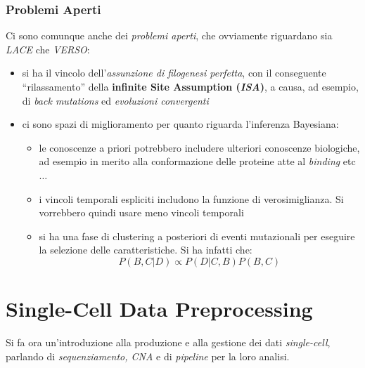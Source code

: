\documentclass[a4paper,12pt, oneside]{book}
\begin{document}
\subsection{Problemi Aperti}
Ci sono comunque anche dei \textit{problemi aperti}, che ovviamente riguardano
sia \textit{LACE} che \textit{VERSO}:
\begin{itemize}
  \item si ha il vincolo dell'\textit{assunzione di filogenesi perfetta}, con il
  conseguente ``rilassamento'' della \textbf{infinite Site Assumption
    (\textit{ISA})}, a causa, ad esempio, di \textit{back mutations} ed
  \textit{evoluzioni convergenti}
  \item ci sono spazi di miglioramento per quanto riguarda l'inferenza
  Bayesiana:
  \begin{itemize}
    \item le conoscenze a priori potrebbero includere ulteriori conoscenze
    biologiche, ad esempio in merito alla conformazione delle proteine atte
    al \textit{binding} etc$\ldots$
    \item i vincoli temporali espliciti includono la funzione di
    verosimiglianza. Si vorrebbero quindi usare meno vincoli temporali
    \item si ha una fase di clustering a posteriori di eventi mutazionali per
    eseguire la selezione delle caratteristiche. Si ha infatti che:
    \[P(B,C|D)\propto P(D|C,B)P(B,C)\]
  \end{itemize}
\end{itemize}
\chapter{Single-Cell Data Preprocessing}
Si fa ora un'introduzione alla produzione e alla gestione dei dati
\textit{single-cell}, parlando di \textit{sequenziamento, CNA} e di
\textit{pipeline} per la loro analisi.
\end{document}
